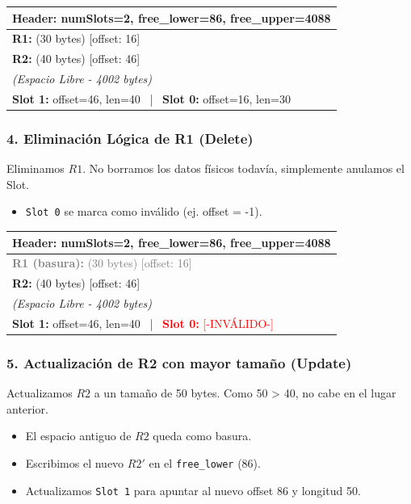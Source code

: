 \documentclass[12pt,a4paper]{article}
\begin{document}
\begin{center}
\begin{tabular}{|p{10cm}|}
\hline
\textbf{Header:} numSlots=2, free\_lower=86, free\_upper=4088 \\ \hline
\textbf{R1:} (30 bytes) [offset: 16] \\ \hline
\textbf{R2:} (40 bytes) [offset: 46] \\ \hline
\textit{(Espacio Libre - 4002 bytes)} \\ \hline
\textbf{Slot 1:} offset=46, len=40 ~|~ \textbf{Slot 0:} offset=16, len=30 \\ \hline
\end{tabular}
\end{center}

\subsubsection*{4. Eliminación Lógica de R1 (Delete)}
Eliminamos $R1$. No borramos los datos físicos todavía, simplemente anulamos el Slot.
\begin{itemize}
    \item \texttt{Slot 0} se marca como inválido (ej. offset = -1).
\end{itemize}

\begin{center}
\begin{tabular}{|p{10cm}|}
\hline
\textbf{Header:} numSlots=2, free\_lower=86, free\_upper=4088 \\ \hline
\textcolor{gray}{\textbf{R1 (basura):} (30 bytes) [offset: 16]} \\ \hline
\textbf{R2:} (40 bytes) [offset: 46] \\ \hline
\textit{(Espacio Libre - 4002 bytes)} \\ \hline
\textbf{Slot 1:} offset=46, len=40 ~|~ \textcolor{red}{\textbf{Slot 0:} [-INVÁLIDO-]} \\ \hline
\end{tabular}
\end{center}

\subsubsection*{5. Actualización de R2 con mayor tamaño (Update)}
Actualizamos $R2$ a un tamaño de 50 bytes. Como 50 > 40, no cabe en el lugar anterior.
\begin{itemize}
    \item El espacio antiguo de $R2$ queda como basura.
    \item Escribimos el nuevo $R2'$ en el \texttt{free\_lower} (86).
    \item Actualizamos \texttt{Slot 1} para apuntar al nuevo offset 86 y longitud 50.
\end{itemize}
\end{document}
